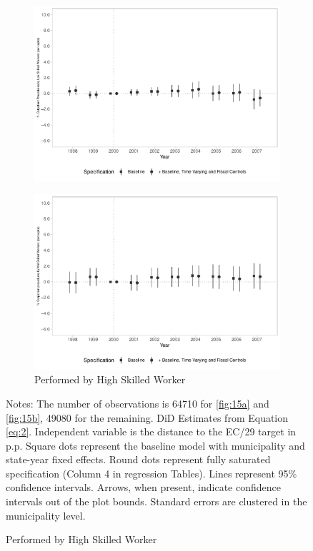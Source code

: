 \begin{figure}[h!]
\begin{center}
\begin{subfigure}{0.32\textwidth}
        \includegraphics[width=\textwidth]{plots/sia_nprod_low_skill_mun_pcapita_dist_ec29_baseline_dist_ec29_baseline_15.pdf}
    \end{subfigure}
    \begin{subfigure}{0.32\textwidth}
        \centering
        \caption{\scriptsize Performed by High Skilled Worker}\label{fig:15f}
        \includegraphics[width=\textwidth]{plots/sia_nprod_med_skill_mun_pcapita_dist_ec29_baseline_dist_ec29_baseline_15.pdf}
    \end{subfigure}
    
    \end{center}
    
        \scriptsize{Notes: The number of observations is 64710 for \ref{fig:15a} and \ref{fig:15b}, 49080 for the remaining. DiD Estimates from Equation \ref{eq:2}. Independent variable is the distance to the EC/29 target in p.p. Square dots represent the baseline model with municipality and state-year fixed effects. Round dots represent fully saturated specification (Column 4 in regression Tables). Lines represent 95\% confidence intervals. Arrows, when present, indicate confidence intervals out of the plot bounds. Standard errors are clustered in the municipality level.}
    
\end{figure}